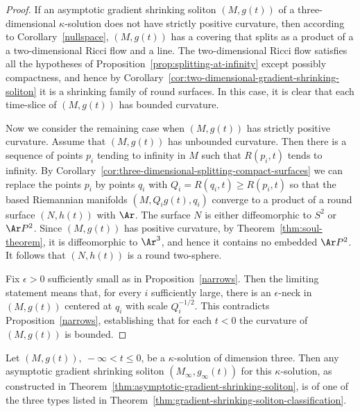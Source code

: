 \begin{proof}
If an asymptotic gradient shrinking soliton $(M,g(t))$ of a three-dimensional
$\kappa$-solution does not have strictly positive curvature, then according to
Corollary~\ref{nullspace}, $(M,g(t))$ has a covering that splits as a product
of a a two-dimensional Ricci flow and a line. The two-dimensional Ricci flow
satisfies all the hypotheses of Proposition~\ref{prop:splitting-at-infinity} except possibly
compactness, and hence by Corollary~\ref{cor:two-dimensional-gradient-shrinking-soliton} it is a shrinking family of
round surfaces. In this case, it is clear that each time-slice of $(M,g(t))$
has bounded curvature.

Now we consider the remaining case when $(M,g(t))$ has strictly positive
curvature.  Assume that $(M,g(t))$ has unbounded curvature. Then there is a
sequence of points $p_i$ tending to infinity in $M$ such that $R(p_i,t)$ tends
to infinity. By Corollary~\ref{cor:three-dimensional-splitting-compact-surfaces} we can replace the points $p_i$ by
points $q_i$ with $Q_i=R(q_i,t)\ge R(p_i,t)$ so that the based Riemannian
manifolds $(M,Q_ig(t),q_i)$ converge to a product of a round surface $(N,h(t))$
with $\Ar$. The surface $N$ is either diffeomorphic to $S^2$ or $\Ar P^2$.
Since $(M,g(t))$ has positive curvature, by Theorem~\ref{thm:soul-theorem}, it is
diffeomorphic to $\Ar ^3$, and hence it contains no embedded $\Ar P^2$. It
follows that $(N,h(t))$ is a round two-sphere.

Fix $\epsilon>0$ sufficiently small as in Proposition~\ref{narrows}. Then the
limiting statement means that, for every $i$ sufficiently large, there is an
$\epsilon$-neck in $(M,g(t))$ centered at $q_i$ with scale $Q_i^{-1/2}$. This
contradicts Proposition~\ref{narrows}, establishing that for each $t<0$ the
curvature of $(M,g(t))$ is bounded.
\end{proof}

\begin{corollary}\label{cor:asymptotic-soliton-classification-application}
Let $(M,g(t)),\ -\infty<t\le 0$, be a $\kappa$-solution of dimension three.
Then any asymptotic gradient shrinking soliton $(M_\infty,g_\infty(t))$ for
this $\kappa$-solution, as constructed in Theorem~\ref{thm:asymptotic-gradient-shrinking-soliton}, is of one of
the three types listed in Theorem~\ref{thm:gradient-shrinking-soliton-classification}.
\end{corollary}


